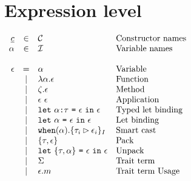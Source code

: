 \documentclass{article}[11pt]
\newcommand{\term}[1]{\verb~#1~}
\begin{document}
    \section{Expression level}\label{sec:expression-level}

    \begin{math}
        \begin{array}{rclp{5cm}}
            \underline{c} & \in  & {\cal C}                                                                     & Constructor names \\
            \alpha        & \in  & {\cal I}                                                                     & Variable names    \\
            \\
            \epsilon & =
            & \alpha                                                                         & Variable              \\
            & \mid & \lambda \alpha . \epsilon                                               & Function              \\
            & \mid & \zeta . \epsilon                                                        & Method              \\
            & \mid & \epsilon ~ \epsilon                                                     & Application              \\
            & \mid & \term{let}~\alpha \term{:} \tau ~ \term{=} ~ \epsilon ~ \term{in} ~ \epsilon & Typed~let~binding              \\
            & \mid & \term{let}~\alpha ~ \term{=} ~ \epsilon ~ \term{in} ~ \epsilon          & Let~binding              \\
            & \mid & \term{when}(\alpha).\{ \tau_i \rhd \epsilon_i \}_I                      & Smart cast              \\
            & \mid & \{\tau, \epsilon\}                                                      & Pack              \\
            & \mid & \term{let} ~ \{\tau, \alpha\} ~ \term{=} ~ \epsilon ~\term{in}~\epsilon & Unpack              \\
            & \mid & \Sigma                                                                  & Trait~term              \\
            & \mid & \epsilon . m                                                            & Trait~term~Usage             \\
        \end{array} \\
    \end{math}
\end{document}
